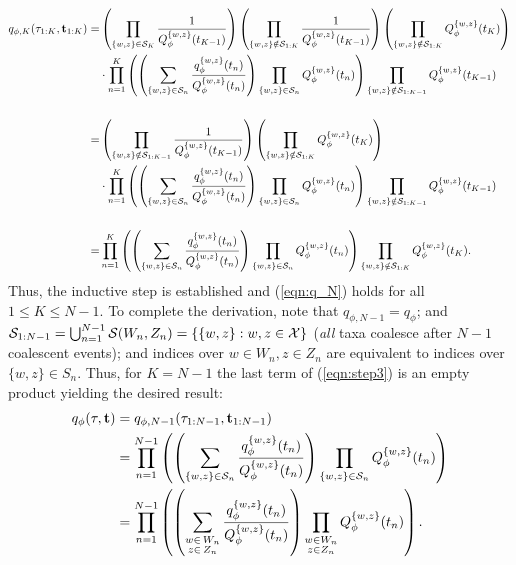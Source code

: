 \begin{doublespace}
\begin{align}
    q_{\phi,K}(\tau_{1:K},\bft_{1:K}) =&
    \left(\prod_{\{w,z\} \in \calS_K} \frac{1}{Q_\phi^{\{w,z\}}(t_{K-1})}\right)
    \left(\prod_{\{w,z\} \notin \calS_{1:K}} \frac{1}{Q_\phi^{\{w,z\}}(t_{K-1})}\right)
    \left(\prod_{\{w,z\} \notin \calS_{1:K}} Q_\phi^{\{w,z\}}(t_{K}) \right)\nonumber \\
    & \cdot
    \prod_{n=1}^{K} \left(\left(\sum_{{\{w,z\} \in \calS_n}} \frac{q_\phi^{\{w,z\}}(t_n)}{Q_\phi^{\{w,z\}}(t_n)}\right)
    \prod_{\{w,z\} \in \calS_n} Q_\phi^{\{w,z\}}(t_n)\right)
    \prod_{\{w,z\} \notin \calS_{1:K-1}} Q_\phi^{\{w,z\}}(t_{K-1}) \label{eqn:step1}   \\ \nonumber \\
    =& \left(\prod_{\{w,z\} \notin \calS_{1:K-1}} \frac{1}{Q_\phi^{\{w,z\}}(t_{K-1})}\right)
    \left(\prod_{\{w,z\} \notin \calS_{1:K}} Q_\phi^{\{w,z\}}(t_{K})\right) \nonumber \\ %
    & \cdot
    \prod_{n=1}^{K}
    \left(\left(\sum_{\{w,z\} \in \calS_n} \frac{q_\phi^{\{w,z\}}(t_n)}{Q_\phi^{\{w,z\}}(t_n)}\right)
    \prod_{\{w,z\} \in \calS_n} Q_\phi^{\{w,z\}}(t_n)\right)
    \prod_{\{w,z\} \notin \calS_{1:K-1}} Q_\phi^{\{w,z\}}(t_{K-1}) \label{eqn:step2b}  \\ \nonumber \\
    =& \prod_{n=1}^{K}
    \left(\left(\sum_{\{w,z\} \in \calS_n} \frac{q_\phi^{\{w,z\}}(t_n)}{Q_\phi^{\{w,z\}}(t_n)}\right)
    \prod_{\{w,z\} \in \calS_n} Q_\phi^{\{w,z\}}(t_n)\right)
    \prod_{\{w,z\} \notin \calS_{1:K}} Q_\phi^{\{w,z\}}(t_{K}).\label{eqn:step3}
\end{align}
Thus, the inductive step is established and (\ref{eqn:q_N}) holds for all $1 \le K \le N - 1$.
To complete the derivation, note that $q_{\phi,N-1} = q_{\phi}$; and $\mathcal{S}_{1:N-1}=\bigcup_{n=1}^{N-1} \mathcal{S}(W_n,Z_n) = \{\{w,z\} : w,z \in \mathcal{X}\}$ (\textit{all} taxa coalesce after $N-1$ coalescent events); and indices over $w\in W_n, z\in Z_n$ are equivalent to indices over $\{w,z\} \in S_n$. Thus, for $K=N-1$ the last term of (\ref{eqn:step3}) is an empty product yielding the desired result:
\begin{align}
    q_{\phi}(\tau,\mathbf{t}) &= q_{\phi,N-1}(\tau_{1:N-1},\mathbf{t}_{1:N-1}) \\
    &= \prod_{n=1}^{N-1}\left(\left(
    \sum_{\{w, z\} \in \mathcal{S}_n} \frac{q_\phi^{\{w,z\}}(t_n)}{Q_\phi^{\{w,z\}}(t_n)}\right)
    \prod_{\{w,z\} \in \mathcal{S}_n} Q_\phi^{\{w,z\}}(t_n)\right) \\
    &= \prod_{n=1}^{N-1}\left(\left(\sum_{\substack{w \in\, W_n\\ z \in\, Z_n}} \frac{q_\phi^{\{w,z\}}(t_n)}{Q_\phi^{\{w,z\}}(t_n)}\right)\prod_{\substack{w \in W_n \\ z \in Z_n}} Q_\phi^{\{w,z\}}(t_n)\right).
\end{align}
\end{doublespace}
\newpage
